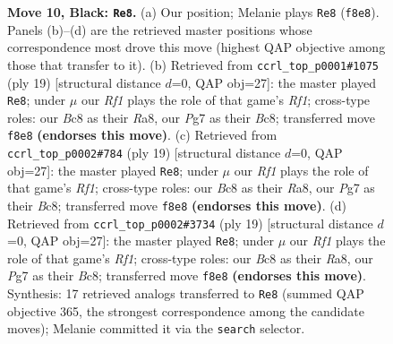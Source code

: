 \documentclass[11pt]{article}
\begin{document}
\begin{figure}[p]
\caption{\textbf{Move 10, Black: \texttt{Re8}.} (a) Our position; Melanie plays \texttt{Re8} (\texttt{f8e8}). Panels (b)--(d) are the retrieved master positions whose correspondence most drove this move (highest QAP objective among those that transfer to it). (b) Retrieved from \texttt{ccrl\_top\_p0001\#1075} (ply 19) [structural distance $d$=0, QAP obj=27]: the master played \texttt{Re8}; under $\mu$ our \emph{Rf1} plays the role of that game's \emph{Rf1}; cross-type roles: our \emph{B}c8 as their \emph{R}a8, our \emph{P}g7 as their \emph{B}c8; transferred move \texttt{f8e8} \textbf{(endorses this move)}. (c) Retrieved from \texttt{ccrl\_top\_p0002\#784} (ply 19) [structural distance $d$=0, QAP obj=27]: the master played \texttt{Re8}; under $\mu$ our \emph{Rf1} plays the role of that game's \emph{Rf1}; cross-type roles: our \emph{B}c8 as their \emph{R}a8, our \emph{P}g7 as their \emph{B}c8; transferred move \texttt{f8e8} \textbf{(endorses this move)}. (d) Retrieved from \texttt{ccrl\_top\_p0002\#3734} (ply 19) [structural distance $d$=0, QAP obj=27]: the master played \texttt{Re8}; under $\mu$ our \emph{Rf1} plays the role of that game's \emph{Rf1}; cross-type roles: our \emph{B}c8 as their \emph{R}a8, our \emph{P}g7 as their \emph{B}c8; transferred move \texttt{f8e8} \textbf{(endorses this move)}. Synthesis: 17 retrieved analogs transferred to \texttt{Re8} (summed QAP objective 365, the strongest correspondence among the candidate moves); Melanie committed it via the \texttt{search} selector.}
\label{fig:thought-m19}
\end{figure}

\clearpage
\end{document}
